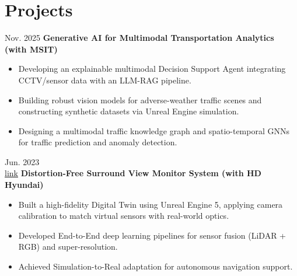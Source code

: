 \documentclass[10pt, letterpaper]{article}
\newenvironment{highlights}{
    \begin{itemize}[
        topsep=0.10 cm,
        parsep=0.10 cm,
        partopsep=0pt,
        itemsep=0pt,
        leftmargin=0.4 cm + 10pt
    ]
}{
    \end{itemize}
} %
\newenvironment{twocolentry_project}[2][]{
    \onecolentry
    \def\secondColumn{#2}
    \setcolumnwidth{\fill, 2.0 cm}
    \begin{paracol}{2}
}{
    \switchcolumn \raggedleft \secondColumn
    \end{paracol}
    \endonecolentry
} %
\let\hrefWithoutArrow\href
\renewcommand{\href}[2]{\hrefWithoutArrow{#1}{\ifthenelse{\equal{#2}{}}{ }{#2 }\raisebox{.15ex}{\footnotesize \faExternalLink*}}}
\begin{document}
    \vspace{0.2 cm}
    \section{Projects}

    \begin{twocolentry_project}{
        Nov. 2025
    }
        \textbf{Generative AI for Multimodal Transportation Analytics (with MSIT)}
        \begin{highlights}
            \item Developing an explainable multimodal Decision Support Agent integrating CCTV/sensor data with an LLM-RAG pipeline.
            \item Building robust vision models for adverse-weather traffic scenes and constructing synthetic datasets via Unreal Engine simulation.
            \item Designing a multimodal traffic knowledge graph and spatio-temporal GNNs for traffic prediction and anomaly detection.
        \end{highlights}
    \end{twocolentry_project}

    \vspace{0.2 cm}

    \begin{twocolentry_project}{
        Jun. 2023\\
        \hrefWithoutArrow{https://github.com/donguk071/UE_SensorSimulator}{\faLink link}
    }
        \textbf{Distortion-Free Surround View Monitor System (with HD Hyundai)}
        \begin{highlights}
            \item Built a high-fidelity Digital Twin using Unreal Engine 5, applying camera calibration to match virtual sensors with real-world optics.
            \item Developed End-to-End deep learning pipelines for sensor fusion (LiDAR + RGB) and super-resolution.
            \item Achieved Simulation-to-Real adaptation for autonomous navigation support.
        \end{highlights}
    \end{twocolentry_project}

\end{document}
